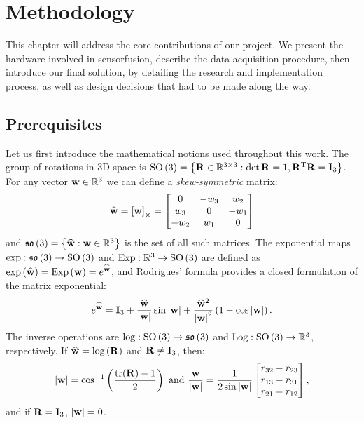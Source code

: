 \chapter{Methodology}
\label{ch:methodology}

This chapter will address the core contributions of our project.
We present the hardware involved in \gls{sensorfusion}, describe the data acquisition procedure, then introduce our final solution, by detailing the research and implementation process, as well as design decisions that had to be made along the way.

\section{Prerequisites}

\newcommand{\wvec}{\vecx{w}}
\newcommand{\what}{\widehat{\vecx{w}}}
\newcommand{\wmod}{\left|\vecx{w}\right|}
\newcommand{\xihat}{\widehat{\xi}}

Let us first introduce the mathematical notions used throughout this work. The group of rotations in 3D space is $\operatorname{SO}\left(3\right) = \left\{\mathbf{R} \in {\mathbb{R}}^{3\times3} : \det{\mathbf{R}} = 1, {\mathbf{R}}^\text{T}\mathbf{R} = \mathbf{I}_3 \right\}$. For any vector $\wvec \in \RR^3$ we can define a \emph{skew-symmetric} matrix:
\begin{equation}
	\what  = \skewsym{\wvec} =
	\begin{bmatrix}
		0    & -w_3 & w_2  \\
		w_3  & 0    & -w_1 \\
		-w_2 & w_1  & 0
	\end{bmatrix}
\end{equation}
and $\so{3} = \left\{\what : \vecx{w} \in \RR^3 \right\}$ is the set of all such matrices.
The exponential maps \mbox{$\text{exp}:\mathfrak{so}\left(3\right) \rightarrow \operatorname{SO}\left(3\right)$} and \mbox{$\text{Exp} :{\mathbb{R}}^3 \rightarrow \operatorname{SO}\left(3\right)$} are defined as
\mbox{$\expmap{\what} =\Expmap{\wvec}= e^{\what}$}, and Rodrigues' formula \cite{murray2017mathematical} provides a closed formulation of the matrix exponential:
\begin{equation}
	e^{\what}= \matx{I}_3 + \frac{\what}{\wmod} \sin{\wmod} + \frac{\what^2}{\wmod^2}\left(1 - \cos{\wmod}\right)\eqdot
\end{equation}
The inverse operations are $\text{log}:  \operatorname{SO}\left(3\right) \rightarrow \mathfrak{so}\left(3\right)$ and $\text{Log} :\operatorname{SO}\left(3\right) \rightarrow {\mathbb{R}}^3$, respectively. If $\what = \logmap{\matx{R}}$ and $\mathbf{R} \neq \mathbf{I}_3$, then:
\begin{equation}
	\wmod = \cos^{-1}\left(\frac{\text{tr}(\matx{R}) - 1}{2}\right)
	\text{ and }
	\frac{\wvec}{\wmod} = \frac{1}{2\sin{\wmod}}\begin{bmatrix}
		r_{32} - r_{23} \\ r_{13} - r_{31} \\ r_{21}-r_{12}
	\end{bmatrix}
	\comma
\end{equation}
and if $\mathbf{R} = \mathbf{I}_3$, $\wmod=0$.

